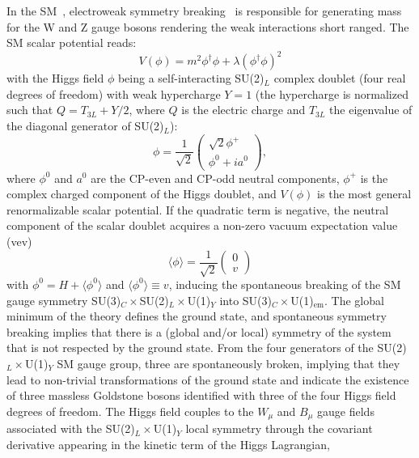 In the SM~\cite{Glashow:1961tr,PhysRevLett.19.1264,PhysRevD.2.1285}, electroweak symmetry breaking~\cite{PhysRevLett.13.321,PhysRev.145.1156} is responsible for generating mass for the W and Z gauge bosons rendering the weak interactions short ranged.
The SM scalar potential reads:
\begin{equation}
    V (\phi) = m^2\phi^\dagger\phi + \lambda(\phi^\dagger\phi)^2
\end{equation}
with the Higgs field $\phi$ being a self-interacting SU(2)$_L$ complex doublet (four real degrees of freedom) with weak hypercharge $Y = 1$ (the hypercharge is normalized such that $Q = T_{3L} + Y /2$, where $Q$ is the electric charge and $T_{3L}$ the eigenvalue of the diagonal generator of SU(2)$_L$):
\begin{equation}
    \phi = \frac{1}{\sqrt{2}}
    \begin{pmatrix}
        \sqrt{2}\phi^+ \\
        \phi^0 + ia^0
    \end{pmatrix},
\end{equation}
where $\phi^0$ and $a^0$ are the CP-even and CP-odd neutral components, $\phi^+$ is the complex charged component of the Higgs doublet, and $V(\phi)$ is the most general renormalizable scalar potential.
If the quadratic term is negative, the neutral component of the scalar doublet acquires a non-zero vacuum expectation value (vev)
\begin{equation}
    \langle\phi\rangle = \frac{1}{\sqrt{2}}
    \begin{pmatrix}
        0 \\ v
    \end{pmatrix}
\end{equation}
with $\phi^0 = H+\langle\phi^0\rangle$ and $\langle\phi^0\rangle \equiv v$, inducing the spontaneous breaking of the SM gauge symmetry SU(3)$_C\times$SU(2)$_L\times$U(1)$_Y$ into SU(3)$_C\times$U(1)$_\text{em}$. The global minimum of the theory defines the ground state, and spontaneous symmetry breaking implies that there is a (global and/or local) symmetry of the system that is not respected by the ground state. From the four generators of the SU(2)$_L\times$U(1)$_Y$ SM gauge group, three are spontaneously broken, implying that they lead to non-trivial transformations of the ground state and indicate the existence of three massless Goldstone bosons identified with three of the four Higgs field degrees of freedom. The Higgs field couples to the $W_\mu$ and $B_\mu$ gauge fields associated with the SU(2)$_L\times$U(1)$_Y$ local symmetry through the covariant derivative appearing in the kinetic term of the Higgs Lagrangian,
